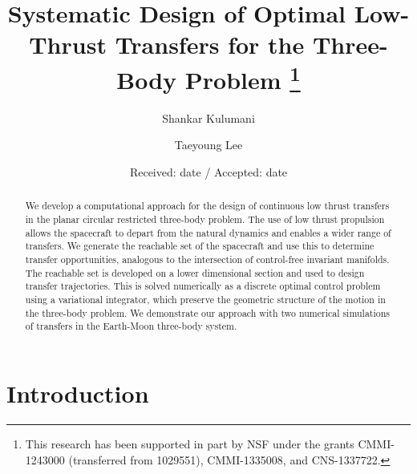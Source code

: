 \documentclass[smallcondensed]{svjour3}
\begin{document}
\title{Systematic Design of Optimal Low-Thrust Transfers for the Three-Body Problem
\thanks{This research has been supported in part by NSF under the grants CMMI-1243000 (transferred from 1029551), CMMI-1335008, and CNS-1337722.}
}

\author{Shankar Kulumani \and Taeyoung Lee}  


\date{Received: date / Accepted: date}

\maketitle{}        
\begin{abstract}
We develop a computational approach for the design of continuous low thrust transfers in the planar circular restricted three-body problem.
The use of low thrust propulsion allows the spacecraft to depart from the natural dynamics and enables a wider range of transfers.
We generate the reachable set of the spacecraft and use this to determine transfer opportunities, analogous to the intersection of control-free invariant manifolds.
The reachable set is developed on a lower dimensional \Poincare section and used to design transfer trajectories. 
This is solved numerically as a discrete optimal control problem using a variational integrator, which preserve the geometric structure of the motion in the three-body problem.
We demonstrate our approach with two numerical simulations of transfers in the Earth-Moon three-body system.
\end{abstract}

\section{Introduction}\label{sec:introduction}
\end{document}
